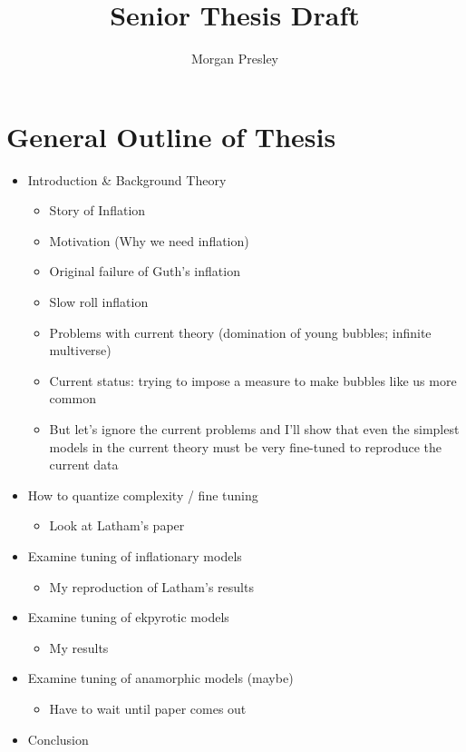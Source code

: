 \documentclass[onecolumn,apj]{emulateapj}
\begin{document}
\title{Senior Thesis Draft}
\author{Morgan Presley}

\section{General Outline of Thesis}
\begin{itemize}
	\item Introduction \& Background Theory
		\begin{itemize}
			\item Story of Inflation
			\item Motivation (Why we need inflation)
			\item Original failure of Guth's inflation
			\item Slow roll inflation
			\item Problems with current theory (domination of young bubbles; infinite multiverse)
			\item Current status: trying to impose a measure to make bubbles like us more common
			\item But let's ignore the current problems and I'll show that even the simplest models in the current theory must be very fine-tuned to reproduce the current data
		\end{itemize}
	\item How to quantize complexity / fine tuning
		\begin{itemize}
			\item Look at Latham's paper
		\end{itemize}
	\item Examine tuning of inflationary models
		\begin{itemize}
			\item My reproduction of Latham's results
		\end{itemize}
	\item Examine tuning of ekpyrotic models
		\begin{itemize}
			\item My results
		\end{itemize}
	\item Examine tuning of anamorphic models (maybe)
		\begin{itemize}
			\item Have to wait until paper comes out
		\end{itemize}	
	\item Conclusion
\end{itemize}
\end{document}
